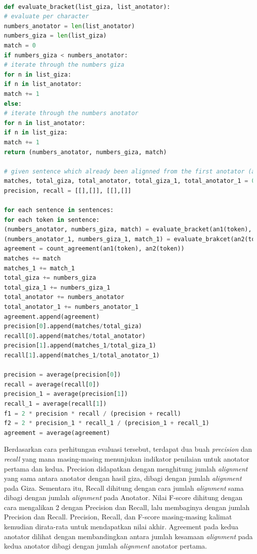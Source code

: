 \begin{lstlisting}[language=Python, caption={Word Alignment Evaluation}, label={word-alignment-evaluation}]

def evaluate_bracket(list_giza, list_anotator):
# evaluate per character
numbers_anotator = len(list_anotator)
numbers_giza = len(list_giza)
match = 0
if numbers_giza < numbers_anotator:
# iterate through the numbers giza
for n in list_giza:
if n in list_anotator:
match += 1
else:
# iterate through the numbers anotator
for n in list_anotator:
if n in list_giza:
match += 1
return (numbers_anotator, numbers_giza, match)

# given sentence which already been alignned from the first anotator (an1), second anotator(an2), and giza(giza)
matches, total_giza, total_anotator, total_giza_1, total_anotator_1 = 0, 0, 0, 0, 0
precision, recall = [[],[]], [[],[]]

for each sentence in sentences:
for each token in sentence:
(numbers_anotator, numbers_giza, match) = evaluate_bracket(an1(token), giza(token))
(numbers_anotator_1, numbers_giza_1, match_1) = evaluate_brakcet(an2(token), giza(token))
agreement = count_agreement(an1(token), an2(token))
matches += match
matches_1 += match_1
total_giza += numbers_giza
total_giza_1 += numbers_giza_1
total_anotator += numbers_anotator
total_anotator_1 += numbers_anotator_1
agreement.append(agreement)
precision[0].append(matches/total_giza)
recall[0].append(matches/total_anotator)
precision[1].append(matches_1/total_giza_1)
recall[1].append(matches_1/total_anotator_1)

precision = average(precision[0])
recall = average(recall[0])
precision_1 = average(precision[1])
recall_1 = average(recall[1])
f1 = 2 * precision * recall / (precision + recall)
f2 = 2 * precision_1 * recall_1 / (precision_1 + recall_1)
agreement = average(agreement)	

\end{lstlisting}

Berdasarkan cara perhitungan evaluasi tersebut, terdapat dua buah \textit{precision} dan \textit{recall} yang mana masing-masing menunjukan indikator penilaian untuk anotator pertama dan kedua. Precision didapatkan dengan menghitung jumlah \textit{alignment} yang sama antara anotator dengan hasil giza, dibagi dengan jumlah \textit{alignment} pada Giza. Sementara itu, Recall dihitung dengan cara jumlah \textit{alignment} sama dibagi dengan jumlah \textit{alignment} pada Anotator. Nilai F-score dihitung dengan cara mengalikan 2 dengan Precision dan Recall, lalu membaginya dengan jumlah Precision dan Recall. Precision, Recall, dan F-score masing-masing kalimat kemudian dirata-rata untuk mendapatkan nilai akhir. Agreement pada kedua anotator dilihat dengan membandingkan antara jumlah kesamaan \textit{alignment} pada kedua anotator dibagi dengan jumlah \textit{alignment} anotator pertama.

